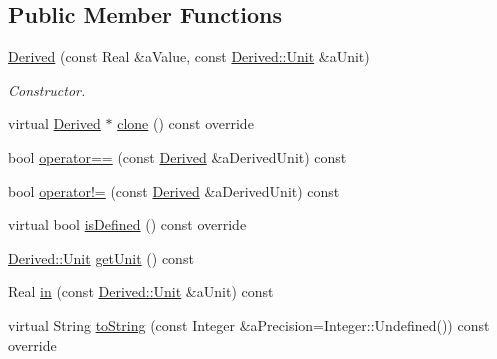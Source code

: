 \subsection*{Public Member Functions}
\begin{DoxyCompactItemize}
\item 
\hyperlink{classlibrary_1_1physics_1_1units_1_1_derived_a526996552af20a987c045ced9bd87fc7}{Derived} (const Real \&a\+Value, const \hyperlink{classlibrary_1_1physics_1_1units_1_1_derived_1_1_unit}{Derived\+::\+Unit} \&a\+Unit)
\begin{DoxyCompactList}\small\item\em Constructor. \end{DoxyCompactList}\item 
virtual \hyperlink{classlibrary_1_1physics_1_1units_1_1_derived}{Derived} $\ast$ \hyperlink{classlibrary_1_1physics_1_1units_1_1_derived_a6328e9f5bcf35f1c587c20f9c3fdb497}{clone} () const override
\item 
bool \hyperlink{classlibrary_1_1physics_1_1units_1_1_derived_a2cee9ae2cea2395bf21e377ee62eac67}{operator==} (const \hyperlink{classlibrary_1_1physics_1_1units_1_1_derived}{Derived} \&a\+Derived\+Unit) const
\item 
bool \hyperlink{classlibrary_1_1physics_1_1units_1_1_derived_a94357c9467421aabdc0a78423e2eef69}{operator!=} (const \hyperlink{classlibrary_1_1physics_1_1units_1_1_derived}{Derived} \&a\+Derived\+Unit) const
\item 
virtual bool \hyperlink{classlibrary_1_1physics_1_1units_1_1_derived_a26c20c57fc3a7c2fb2ff215d6d4687a2}{is\+Defined} () const override
\item 
\hyperlink{classlibrary_1_1physics_1_1units_1_1_derived_1_1_unit}{Derived\+::\+Unit} \hyperlink{classlibrary_1_1physics_1_1units_1_1_derived_a020b4ab6cb1d2ed73b01cde2bf1aab0e}{get\+Unit} () const
\item 
Real \hyperlink{classlibrary_1_1physics_1_1units_1_1_derived_a6ea039897b7a5905b096db05e392c484}{in} (const \hyperlink{classlibrary_1_1physics_1_1units_1_1_derived_1_1_unit}{Derived\+::\+Unit} \&a\+Unit) const
\item 
virtual String \hyperlink{classlibrary_1_1physics_1_1units_1_1_derived_a3626d6c77e6753f44232067856fde9d1}{to\+String} (const Integer \&a\+Precision=Integer\+::\+Undefined()) const override
\end{DoxyCompactItemize}
